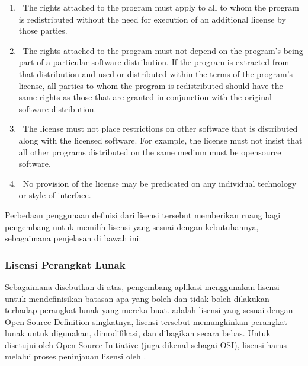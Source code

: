 \documentclass[letterpaper,10pt,english]{sphinxmanual}
\begin{document}
\begin{enumerate}
\item {} 
  The rights attached to the program must apply to all to whom the program is redistributed without the need for execution of an additional license by those parties.

\item {} 
  The rights attached to the program must not depend on the program’s being part of a particular software distribution. If the program is extracted from that distribution and used or distributed within the terms of the program’s license, all parties to whom the program is redistributed should have the same rights as those that are granted in conjunction with the original software distribution.

\item {} 
  The license must not place restrictions on other software that is distributed along with the licensed software. For example, the license must not insist that all other programs distributed on the same medium must be open\sphinxhyphen{}source software.

\item {} 
  No provision of the license may be predicated on any individual technology or style of interface.

\end{enumerate}

Perbedaan penggunaan definisi dari lisensi tersebut memberikan ruang bagi pengembang untuk memilih lisensi yang sesuai dengan kebutuhannya, sebagaimana penjelasan di bawah ini:


\subsubsection{Lisensi Perangkat Lunak}
\label{\detokenize{sesi1/fossgis:lisensi-perangkat-lunak}}
Sebagaimana disebutkan di atas, pengembang aplikasi menggunakan lisensi untuk mendefinisikan batasan apa yang boleh dan tidak boleh dilakukan terhadap perangkat lunak yang mereka buat.  adalah lisensi yang sesuai dengan Open Source Definition \sphinxhyphen{} singkatnya, lisensi tersebut memungkinkan perangkat lunak untuk digunakan, dimodifikasi, dan dibagikan secara bebas. Untuk disetujui oleh Open Source Initiative (juga dikenal sebagai OSI), lisensi harus melalui proses peninjauan lisensi oleh .
\end{document}
